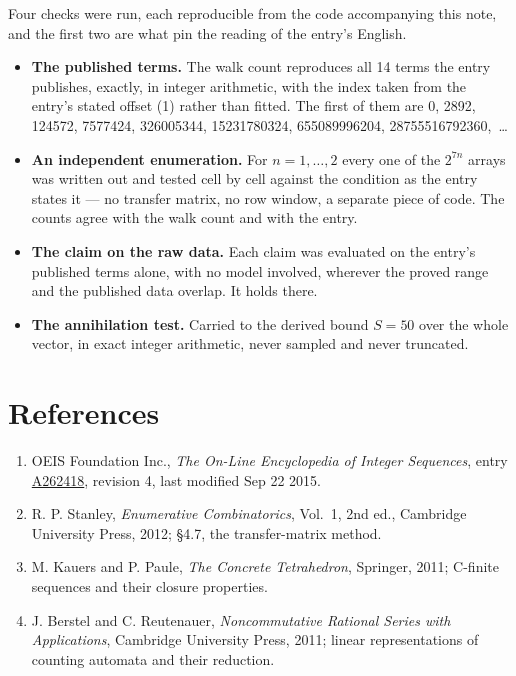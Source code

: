 \documentclass[11pt]{article}
\theoremstyle{definition}
\begin{document}
Four checks were run, each reproducible from the code accompanying this note, and the first two are what pin the reading of the entry's English.

\begin{itemize}

\item {\bfseries The published terms.} The walk count reproduces all 14 terms the entry publishes, exactly, in integer arithmetic, with the index taken from the entry's stated offset (1) rather than fitted. The first of them are 0, 2892, 124572, 7577424, 326005344, 15231780324, 655089996204, 28755516792360,~\dots

\item {\bfseries An independent enumeration.} For $n = 1,\dots,2$ every one of the $2^{7n}$ arrays was written out and tested cell by cell against the condition as the entry states it --- no transfer matrix, no row window, a separate piece of code. The counts agree with the walk count and with the entry.

\item {\bfseries The claim on the raw data.} Each claim was evaluated on the entry's published terms alone, with no model involved, wherever the proved range and the published data overlap. It holds there.

\item {\bfseries The annihilation test.} Carried to the derived bound $S = 50$ over the whole vector, in exact integer arithmetic, never sampled and never truncated.

\end{itemize}

\section{References}

\begin{enumerate}

\item OEIS Foundation Inc., \emph{The On-Line Encyclopedia of Integer Sequences}, entry \href{https://oeis.org/A262418}{A262418}, revision 4, last modified Sep 22 2015.

\item R. P. Stanley, \emph{Enumerative Combinatorics}, Vol.~1, 2nd ed., Cambridge University Press, 2012; \S4.7, the transfer-matrix method.

\item M. Kauers and P. Paule, \emph{The Concrete Tetrahedron}, Springer, 2011; C-finite sequences and their closure properties.

\item J. Berstel and C. Reutenauer, \emph{Noncommutative Rational Series with Applications}, Cambridge University Press, 2011; linear representations of counting automata and their reduction.

\end{enumerate}
\end{document}
